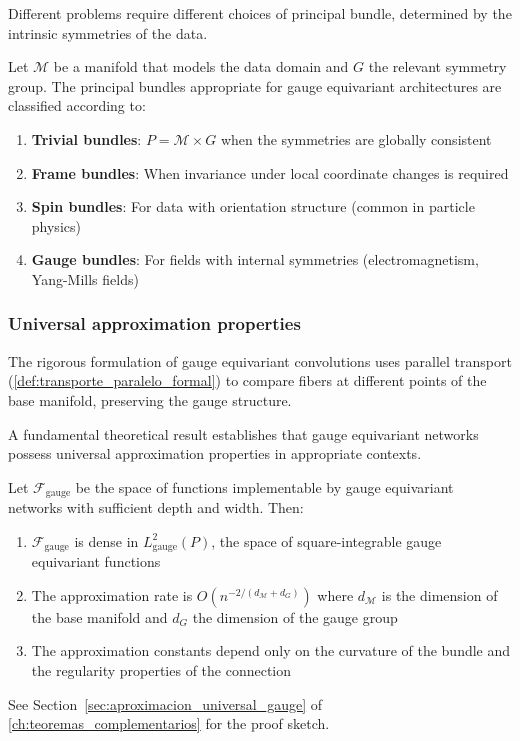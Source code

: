 Different problems require different choices of principal bundle, determined by the intrinsic symmetries of the data.

\begin{theorem}
Let $\mathcal{M}$ be a manifold that models the data domain and $G$ the relevant symmetry group. The principal bundles appropriate for gauge equivariant architectures are classified according to:

\begin{enumerate}
\item \textbf{Trivial bundles}: $P = \mathcal{M} \times G$ when the symmetries are globally consistent
\item \textbf{Frame bundles}: When invariance under local coordinate changes is required
\item \textbf{Spin bundles}: For data with orientation structure (common in particle physics)
\item \textbf{Gauge bundles}: For fields with internal symmetries (electromagnetism, Yang-Mills fields)
\end{enumerate}
\end{theorem}

\subsubsection{Universal approximation properties}

The rigorous formulation of gauge equivariant convolutions uses parallel transport (\autoref{def:transporte_paralelo_formal}) to compare fibers at different points of the base manifold, preserving the gauge structure.

A fundamental theoretical result establishes that gauge equivariant networks possess universal approximation properties in appropriate contexts.

\begin{theorem}
Let $\mathcal{F}_{\text{gauge}}$ be the space of functions implementable by gauge equivariant networks with sufficient depth and width. Then:

\begin{enumerate}
\item $\mathcal{F}_{\text{gauge}}$ is dense in $L^2_{\text{gauge}}(P)$, the space of square-integrable gauge equivariant functions
\item The approximation rate is $O(n^{-2/(d_{\mathcal{M}} + d_G)})$ where $d_{\mathcal{M}}$ is the dimension of the base manifold and $d_G$ the dimension of the gauge group
\item The approximation constants depend only on the curvature of the bundle and the regularity properties of the connection
\end{enumerate}

See Section~\ref{sec:aproximacion_universal_gauge} of \autoref{ch:teoremas_complementarios} for the proof sketch.
\end{theorem}

